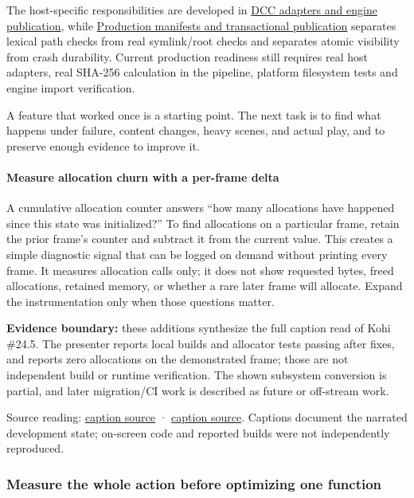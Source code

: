 The host-specific responsibilities are developed in \hyperref[appendix-03ade9e1875f]{DCC adapters and engine publication}, while \hyperref[appendix-91eaa3cbdbc3]{Production manifests and transactional publication} separates lexical path checks from real symlink/root checks and separates atomic visibility from crash durability. Current production readiness still requires real host adapters, real SHA-256 calculation in the pipeline, platform filesystem tests and engine import verification.

A feature that worked once is a starting point. The next task is to find what happens under failure, content changes, heavy scenes, and actual play, and to preserve enough evidence to improve it.

\paragraph{Measure allocation churn with a per-frame delta}\label{measure-allocation-churn-with-a-per-frame-delta}

A cumulative allocation counter answers ``how many allocations have happened since this state was initialized?'' To find allocations on a particular frame, retain the prior frame's counter and subtract it from the current value. This creates a simple diagnostic signal that can be logged on demand without printing every frame. It measures allocation calls only; it does not show requested bytes, freed allocations, retained memory, or whether a rare later frame will allocate. Expand the instrumentation only when those questions matter.

\textbf{Evidence boundary:} these additions synthesize the full caption read of Kohi \#24.5. The presenter reports local builds and allocator tests passing after fixes, and reports zero allocations on the demonstrated frame; those are not independent build or runtime verification. The shown subsystem conversion is partial, and later migration/CI work is described as future or off-stream work.

Source reading: \href{https://www.youtube.com/watch?v=3ZFcvBjRFN0}{caption source} · \href{https://www.youtube.com/watch?v=KanKG-vd9GA}{caption source}. Captions document the narrated development state; on-screen code and reported builds were not independently reproduced.

\subsubsection{Measure the whole action before optimizing one function}\label{measure-the-whole-action-before-optimizing-one-function}

